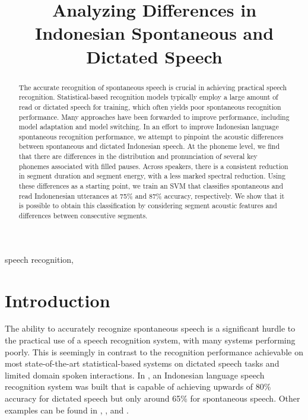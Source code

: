 \documentclass[conference]{IEEEtran}
\begin{document}
\title{Analyzing Differences in Indonesian Spontaneous and Dictated Speech}

\author {
}

\maketitle

\begin{abstract}
The accurate recognition of spontaneous speech is crucial in achieving practical speech recognition.
Statistical-based recognition models typically employ a large amount of read or dictated speech for training, which often yields poor spontaneous recognition performance.
Many approaches have been forwarded to improve performance, including model adaptation and model switching.
In an effort to improve Indonesian language spontaneous recognition performance, we attempt to pinpoint the acoustic differences between spontaneous and dictated Indonesian speech.
At the phoneme level, we find that there are differences in the distribution and pronunciation of several key phonemes associated with filled pauses.
Across speakers, there is a consistent reduction in segment duration and segment energy, with a less marked spectral reduction.
Using these differences as a starting point, we train an SVM that classifies spontaneous and read Indonenesian utterances at 75\% and 87\% accuracy, respectively.
We show that it is possible to obtain this classification by considering segment acoustic features and differences between consecutive segments.
\end{abstract}

\begin{IEEEkeywords}
speech recognition,
\end{IEEEkeywords}

\IEEEpeerreviewmaketitle

\section{Introduction}
The ability to accurately recognize spontaneous speech is a significant hurdle to the practical use of a speech recognition system, with many systems performing poorly.
This is seemingly in contrast to the recognition performance achievable on most state-of-the-art statistical-based systems on dictated speech tasks and limited domain spoken interactions.
In \cite{hoesen}, an Indonesian language speech recognition system was built that is capable of achieving upwards of 80\% accuracy for dictated speech but only around 65\% for spontaneous speech.
Other examples can be found in \cite{}, \cite{}, and \cite{}.
\end{document}
